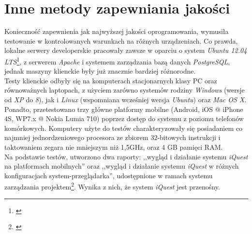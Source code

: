 \section{Inne metody zapewniania jakości}
\label{Chapter74}

Konieczność zapewnienia jak najwyższej jakości oprogramowania, wymusiła testowanie w kontrolowanych warunkach na różnych urządzeniach. Co prawda, lokalne serwery developerskie pracowały zawsze w oparciu o system \textit{Ubuntu 12.04 LTS}\footnote{\cite{Man:Ubuntu}}, z serwerem \textit{Apache} i systemem zarządzania bazą danych \textit{PostgreSQL}, jednak maszyny klienckie były już znacznie bardziej różnorodne. \\

Testy klienckie odbyły się na komputerach stacjonarnych klasy PC oraz równoważnych laptopach, z użyciem zarówno systemów rodziny \textit{Windows} (wersje od \textit{XP} do \textit{8}), jak i \textit{Linux} (wspomniana wcześniej wersja \textit{Ubuntu}) oraz \textit{Mac OS X}. Ponadto, przetestowano trzy główne platformy mobilne (Android, iOS @ iPhone 4S, WP7.x @ Nokia Lumia 710) poprzez dostęp do systemu z poziomu telefonów komórkowych. Komputery użyte do testów charakteryzowały się posiadaniem co najmniej jednordzeniowego procesora ze zbiorem 32-bitowych instrukcji i taktowaniem zegara nie mniejszym niż 1,5GHz, oraz 4 GB pamięci RAM. \\

Na podstawie testów, utworzono dwa raporty: ,,wygląd i działanie systemu \textit{iQuest} na platformach mobilnych'' oraz ,,wygląd i działanie systemu \textit{iQuest} w różnych konfiguracjach system-przeglądarka'', udostępnione w ramach systemu zarządzania projektem\footnote{\cite{Redmine:ProjDocs}}. Wynika z nich, że system \textit{iQuest} jest przenośny.